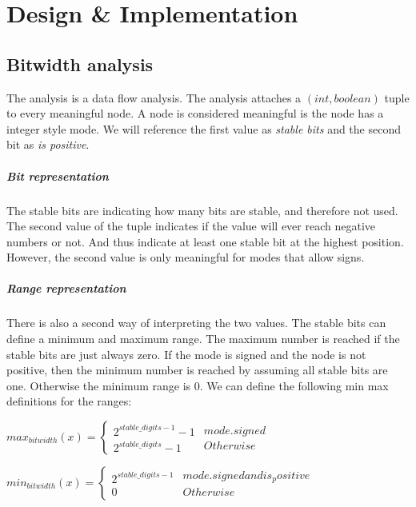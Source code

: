 \chapter{Design \& Implementation}\label{sec:impl}

\section{Bitwidth analysis}
The analysis is a data flow analysis. The analysis attaches a $(int,boolean)$ tuple to every meaningful node. A node is considered meaningful is the node has a integer style mode. We will reference the first value as \emph{stable bits} and the second bit as \emph{is positive}.

\paragraph{Bit representation}
The stable bits are indicating how many bits are stable, and therefore not used.
The second value of the tuple indicates if the value will ever reach negative numbers or not. And thus indicate at least one stable bit at the highest position. However, the second value is only meaningful for modes that allow signs.

\paragraph{Range representation}
There is also a second way of interpreting the two values. The stable bits can define a minimum and maximum range. The maximum number is reached if the stable bits are just always zero. If the mode is signed and the node is not positive, then the minimum number is reached by assuming all stable bits are one. Otherwise the minimum range is 0. We can define the following min max definitions for the ranges:

$
max_{bitwidth}(x)=
\left\{
\begin{array}{l}2^{stable\_digits-1}-1\\2^{stable\_digits}-1\end{array}
\begin{array}{l} {mode.signed} \\ {Otherwise} \end{array}
\right.
$

$
min_{bitwidth}(x)=
\left\{
\begin{array}{l}2^{stable\_digits-1}\\0\end{array}
\begin{array}{l} {mode.signed and is_positive} \\ {Otherwise} \end{array}
\right.
$

